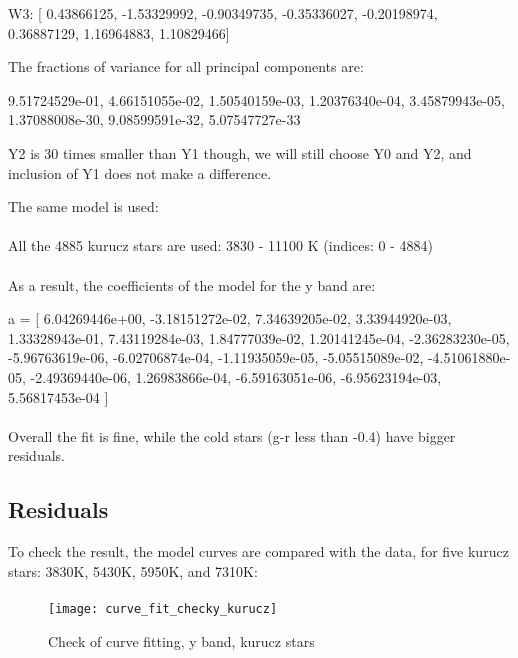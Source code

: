 W3:  [ 0.43866125, -1.53329992, -0.90349735, -0.35336027, -0.20198974,  0.36887129,  1.16964883,  1.10829466]


The fractions of variance for all principal components are:

 9.51724529e-01,   4.66151055e-02,   1.50540159e-03,   1.20376340e-04,   3.45879943e-05,   1.37088008e-30,   9.08599591e-32,   5.07547727e-33

Y2 is 30 times smaller than Y1 though, we will still choose Y0 and Y2, and inclusion of Y1 does not make a difference.

The same model is used:

\paragraph{}
All the 4885 kurucz stars are used: 3830 - 11100 K (indices: 0 - 4884)
\paragraph{}
As a result, the coefficients of the model for the y band are:

a = [ 6.04269446e+00,  -3.18151272e-02,   7.34639205e-02,   3.33944920e-03,   1.33328943e-01,   7.43119284e-03,   1.84777039e-02,
      1.20141245e-04,  -2.36283230e-05,   -5.96763619e-06,  -6.02706874e-04,  -1.11935059e-05,  -5.05515089e-02,  -4.51061880e-05,  
      -2.49369440e-06,   1.26983866e-04,  -6.59163051e-06,  -6.95623194e-03,   5.56817453e-04 ]

\paragraph{}
Overall the fit is fine,  while the cold stars (g-r less than -0.4) have bigger residuals.


\clearpage
\subsection{Residuals}

To check the result, the model curves are compared with the data, for five kurucz stars: 3830K, 5430K, 5950K, and 7310K:
\paragraph{}
\graphicspath{{/home/bruno/users/weh40/Pictures/5figs/}}
\begin{figure}[h!]
\begin{center}
\texttt{[image: curve\_fit\_checky\_kurucz]}
\caption{Check of curve fitting, y band, kurucz stars}
\end{center}
\end{figure}
\FloatBarrier

